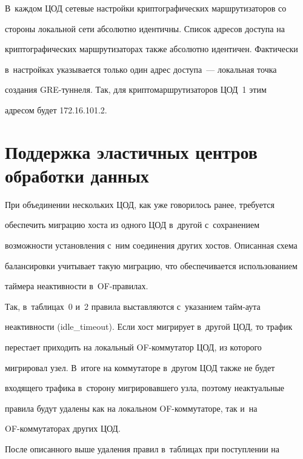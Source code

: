 В~каждом ЦОД сетевые настройки криптографических маршрутизаторов со 


стороны локальной сети абсолютно идентичны. Список адресов доступа на 


криптографических маршрутизаторах также абсолютно идентичен. Фактически 


в~настройках указывается только один адрес доступа~--- локальная точка 


создания GRE-тун\-не\-ля. Так, для криптомаршрутизаторов ЦОД~1 этим 


адресом будет 172.16.101.2.


  


\section{Поддержка эластичных центров обработки данных}





  При объединении нескольких ЦОД, как уже говорилось ранее, требуется 


обеспечить миграцию хоста из одного ЦОД в~другой с~сохранением 


возможности установления с~ним соединения других хостов. Описанная схема 


балансировки учитывает такую миграцию, что обеспечивается использованием 


таймера неактивности в~OF-пра\-ви\-лах.


  


  Так, в~таблицах~0 и~2 правила выставляются с~указанием тайм-аута 


неактивности (idle\_timeout). Если хост мигрирует в~другой ЦОД, то трафик 


перестает приходить на локальный OF-ком\-му\-та\-тор ЦОД, из которого 


мигрировал узел. В~итоге на коммутаторе в~другом ЦОД также не будет 


входящего трафика в~сторону мигрировавшего узла, поэтому неактуальные 


правила будут удалены как на локальном OF-ком\-му\-та\-то\-ре, так и~на  


OF-ком\-му\-та\-то\-рах других ЦОД.


  


  После описанного выше удаления правил в~таблицах при поступлении на  


